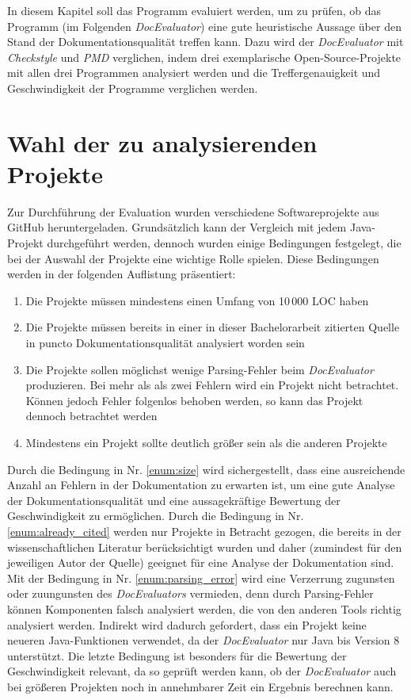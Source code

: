 \newcommand{\checkpmd}{\textit{Checkstyle} und \textit{PMD} }
\newcommand{\doceval}{\textit{DocEvaluator} }
In diesem Kapitel soll das Programm evaluiert werden, um zu prüfen, ob das Programm (im Folgenden \textit{DocEvaluator}) eine gute heuristische Aussage über den Stand der Dokumentationsqualität treffen kann. Dazu wird der \textit{DocEvaluator} mit \checkpmd{} verglichen, indem drei exemplarische Open-Source-Projekte mit allen drei Programmen analysiert werden und die Treffergenauigkeit und Geschwindigkeit der Programme verglichen werden. 

\section{Wahl der zu analysierenden Projekte}
Zur Durchführung der Evaluation wurden verschiedene Softwareprojekte aus GitHub heruntergeladen. Grundsätzlich kann der Vergleich mit jedem Java-Projekt durchgeführt werden, dennoch wurden einige Bedingungen festgelegt, die bei der Auswahl der Projekte eine wichtige Rolle spielen. Diese Bedingungen werden in der folgenden Auflistung präsentiert:

\begin{enumerate}
    \item \label{enum:size} Die Projekte müssen mindestens einen Umfang von 10\,000 \ac{LOC} haben
    \item \label{enum:already_cited} Die Projekte müssen bereits in einer in dieser Bachelorarbeit zitierten Quelle in puncto Dokumentationsqualität analysiert worden sein
    \item \label{enum:parsing_error}  Die Projekte sollen möglichst wenige Parsing-Fehler beim \doceval produzieren. Bei mehr als als zwei Fehlern wird ein Projekt nicht betrachtet. Können jedoch Fehler folgenlos behoben werden, so kann das Projekt dennoch betrachtet werden
    \item Mindestens ein Projekt sollte deutlich größer sein als die anderen Projekte
\end{enumerate}
 Durch die Bedingung in Nr. \ref{enum:size} wird sichergestellt, dass eine ausreichende Anzahl an Fehlern in der Dokumentation zu erwarten ist, um eine gute Analyse der Dokumentationsqualität  und eine aussagekräftige Bewertung der Geschwindigkeit zu ermöglichen. Durch die Bedingung in Nr.  \ref{enum:already_cited} werden nur Projekte in Betracht gezogen, die bereits in der wissenschaftlichen Literatur berücksichtigt wurden und daher (zumindest für den jeweiligen Autor der Quelle) geeignet für eine Analyse der Dokumentation sind. Mit der Bedingung in Nr. \ref{enum:parsing_error} wird eine Verzerrung zugunsten oder zuungunsten des \textit{DocEvaluators} vermieden, denn durch Parsing-Fehler können Komponenten falsch analysiert werden, die von den anderen Tools richtig analysiert werden. Indirekt wird dadurch gefordert, dass ein Projekt keine neueren Java-Funktionen verwendet, da  der \textit{DocEvaluator} nur Java bis Version 8 unterstützt. Die letzte Bedingung ist besonders für die Bewertung der Geschwindigkeit relevant, da so geprüft werden kann, ob der \doceval auch bei größeren Projekten noch in annehmbarer Zeit ein Ergebnis berechnen kann. 
 
